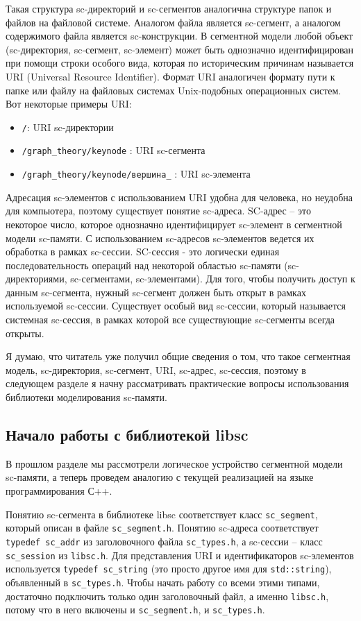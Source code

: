 Такая структура sc-директорий и sc-сегментов аналогична структуре
папок и файлов на файловой системе. Аналогом файла является
sc-сегмент, а аналогом содержимого файла является sc-конструкции. В
сегментной модели любой объект (sc-директория, sc-сегмент, sc-элемент)
может быть однозначно идентифицирован при помощи строки особого вида,
которая по историческим причинам называется URI (Universal Resource
Identifier). Формат URI аналогичен формату пути к папке или файлу на
файловых системах Unix-подобных операционных систем. Вот некоторые
примеры URI:

\begin{itemize}
\item \verb|/|: URI sc-директории
\item \verb|/graph_theory/keynode| : URI sc-сегмента
\item \verb|/graph_theory/keynode/вершина_| : URI sc-элемента
\end{itemize}

Адресация sc-элементов с использованием URI удобна для человека, но
неудобна для компьютера, поэтому существует понятие
sc-адреса. SC-адрес – это некоторое число, которое однозначно
идентифицирует sc-элемент в сегментной модели sc-памяти. С
использованием sc-адресов sc-элементов ведется их обработка в рамках
sc-сессии. SC-сессия - это логически единая последовательность
операций над некоторой областью sc-памяти (sc-директориями,
sc-сегментами, sc-элементами). Для того, чтобы получить доступ к
данным sc-сегмента, нужный sc-сегмент должен быть открыт в рамках
используемой sc-сессии. Существует особый вид sc-сессии, который
называется системная sc-сессия, в рамках которой все существующие
sc-сегменты всегда открыты.

Я думаю, что читатель уже получил общие сведения о том, что такое
сегментная модель, sc-директория, sc-сегмент, URI, sc-адрес,
sc-сессия, поэтому в следующем разделе я начну рассматривать
практические вопросы использования библиотеки моделирования sc-памяти.

\subsection{Начало работы с библиотекой libsc}
\label{sec:Begin_with_libsc}

В прошлом разделе мы рассмотрели логическое устройство сегментной
модели sc-памяти, а теперь проведем аналогию с текущей реализацией на
языке программирования С++.

Понятию sc-сегмента в библиотеке libsc соответствует класс
\lstinline{sc_segment}, который описан в файле
\verb|sc_segment.h|. Понятию sc-адреса соответствует
\lstinline{typedef sc_addr} из заголовочного файла \verb|sc_types.h|,
а sc-сессии – класс \lstinline{sc_session} из \verb|libsc.h|. Для
представления URI и идентификаторов sc-элементов используется
\lstinline{typedef sc_string} (это просто другое имя для
\lstinline{std::string}), объявленный в \verb|sc_types.h|. Чтобы
начать работу со всеми этими типами, достаточно подключить только один
заголовочный файл, а именно \verb|libsc.h|, потому что в него включены
и \verb|sc_segment.h|, и \verb|sc_types.h|.

